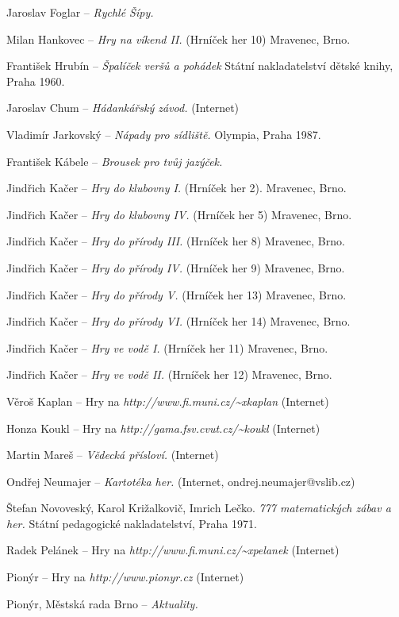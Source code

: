 \begin{multicols}{2}
\begin{list}{[]}{}
\item Jaroslav Foglar -- {\it Rychlé Šípy.}
\item Milan Hankovec -- {\it Hry na víkend II.} (Hrníček her 10)
  Mravenec, Brno.
\item František Hrubín -- {\it Špalíček veršů a pohádek}
  Státní nakladatelství dětské knihy, Praha 1960.
\item Jaroslav Chum -- {\it Hádankářský závod.}
  (Internet)
\item Vladimír Jarkovský -- {\it Nápady pro sídliště.}
  Olympia, Praha 1987.
\item František Kábele -- {\it Brousek pro tvůj jazýček.}
\item Jindřich Kačer -- {\it Hry do klubovny I.} (Hrníček her 2).
  Mravenec, Brno.
\item Jindřich Kačer -- {\it Hry do klubovny IV.} (Hrníček her 5)
  Mravenec, Brno.
\item Jindřich Kačer -- {\it Hry do přírody III.} (Hrníček her 8)
  Mravenec, Brno.
\item Jindřich Kačer -- {\it Hry do přírody IV.} (Hrníček her 9)
  Mravenec, Brno.
\item Jindřich Kačer -- {\it Hry do přírody V.} (Hrníček her 13)
  Mravenec, Brno.
\item Jindřich Kačer -- {\it Hry do přírody VI.} (Hrníček her 14)
  Mravenec, Brno.
\item Jindřich Kačer -- {\it Hry ve vodě I.} (Hrníček her 11)
  Mravenec, Brno.
\item Jindřich Kačer -- {\it Hry ve vodě II.} (Hrníček her 12)
  Mravenec, Brno.
\item Věroš Kaplan -- Hry na {\it http://www.fi.muni.cz/{\textasciitilde}xkaplan}
  (Internet)
\item Honza Koukl -- Hry na {\it http://gama.fsv.cvut.cz/{\textasciitilde}koukl}
  (Internet)
\item Martin Mareš -- {\it Vědecká přísloví.}
  (Internet)
\item Ondřej Neumajer -- {\it Kartotéka her.}
  (Internet, ondrej.neumajer@vslib.cz)
\item Štefan Novoveský, Karol Križalkovič, Imrich Lečko.
  {\it 777 matematických zábav a her.} Státní pedagogické nakladatelství,
  Praha 1971.
\item Radek Pelánek -- Hry na {\it http://www.fi.muni.cz/{\textasciitilde}xpelanek}
  (Internet)
\item Pionýr -- Hry na {\it http://www.pionyr.cz}
  (Internet)
\item Pionýr, Městská rada Brno -- {\it Aktuality.}

\end{list}
\end{multicols}
